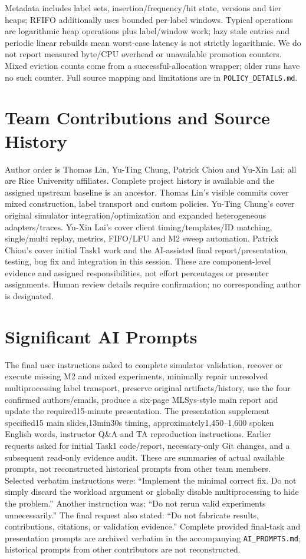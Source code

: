 \documentclass{article}
\begin{document}
Metadata includes label sets, insertion/frequency/hit state, versions and tier heaps; RFIFO additionally uses bounded per-label windows. Typical operations are logarithmic heap operations plus label/window work; lazy stale entries and periodic linear rebuilds mean worst-case latency is not strictly logarithmic. We do not report measured byte/CPU overhead or unavailable promotion counters. Mixed eviction counts come from a successful-allocation wrapper; older runs have no such counter. Full source mapping and limitations are in \texttt{POLICY\_DETAILS.md}.

\section{Team Contributions and Source History}
Author order is Thomas Lin, Yu-Ting Chung, Patrick Chiou and Yu-Xin Lai; all are Rice University affiliates. Complete project history is available and the assigned upstream baseline is an ancestor. Thomas Lin's visible commits cover mixed construction, label transport and custom policies. Yu-Ting Chung's cover original simulator integration/optimization and expanded heterogeneous adapters/traces. Yu-Xin Lai's cover client timing/templates/ID matching, single/multi replay, metrics, FIFO/LFU and M2 sweep automation. Patrick Chiou's cover initial Task1 work and the AI-assisted final report/presentation, testing, bug fix and integration in this session. These are component-level evidence and assigned responsibilities, not effort percentages or presenter assignments. Human review details require confirmation; no corresponding author is designated.

\section{Significant AI Prompts}
The final user instructions asked to complete simulator validation, recover or execute missing M2 and mixed experiments, minimally repair unresolved multiprocessing label transport, preserve original artifacts/history, use the four confirmed authors/emails, produce a six-page MLSys-style main report and update the required15-minute presentation. The presentation supplement specified15 main slides,13min30s timing, approximately1,450--1,600 spoken English words, instructor Q\&A and TA reproduction instructions. Earlier requests asked for initial Task1 code/report, necessary-only Git changes, and a subsequent read-only evidence audit. These are summaries of actual available prompts, not reconstructed historical prompts from other team members. Selected verbatim instructions were: ``Implement the minimal correct fix. Do not simply discard the workload argument or globally disable multiprocessing to hide the problem.'' Another instruction was: ``Do not rerun valid experiments unnecessarily.'' The final request also stated: ``Do not fabricate results, contributions, citations, or validation evidence.'' Complete provided final-task and presentation prompts are archived verbatim in the accompanying \texttt{AI\_PROMPTS.md}; historical prompts from other contributors are not reconstructed.
\end{document}

